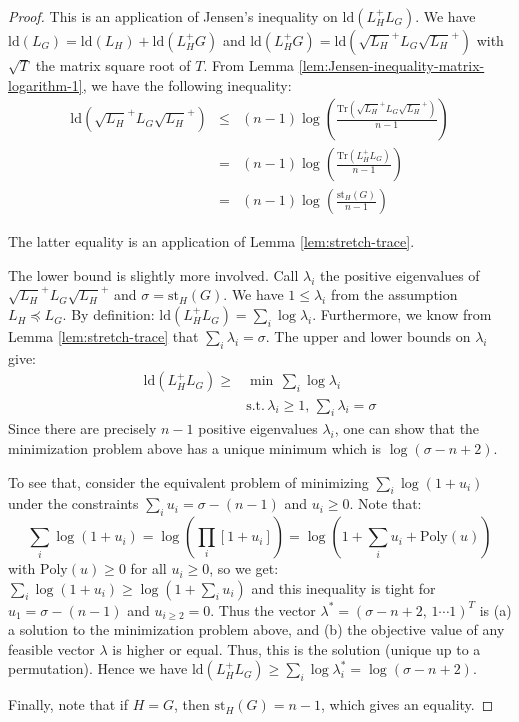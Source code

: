 \begin{proof}
This is an application of Jensen's inequality on $\text{ld}\left(L_{H}^{+}L_{G}\right)$.
We have $\text{ld}(L_{G})=\text{ld}(L_{H})+\text{ld}\left(L_{H}^{+}G\right)$
and $\text{ld}\left(L_{H}^{+}G\right)=\text{ld}\left(\sqrt{L_{H}}^{+}L_{G}\sqrt{L_{H}}^{+}\right)$
with $\sqrt{T}$ the matrix square root of $T$. From Lemma \ref{lem:Jensen-inequality-matrix-logarithm-1},
we have the following inequality: 
\begin{eqnarray*}
\text{ld}\left(\sqrt{L_{H}}^{+}L_{G}\sqrt{L_{H}}^{+}\right) & \leq & \left(n-1\right)\log\left(\frac{\text{Tr}\left(\sqrt{L_{H}}^{+}L_{G}\sqrt{L_{H}}^{+}\right)}{n-1}\right)\\
 & = & \left(n-1\right)\log\left(\frac{\text{Tr}\left(L_{H}^{+}L_{G}\right)}{n-1}\right)\\
 & = & \left(n-1\right)\log\left(\frac{\text{st}_{H}\left(G\right)}{n-1}\right)
\end{eqnarray*}


The latter equality is an application of Lemma \ref{lem:stretch-trace}.

The lower bound is slightly more involved. Call $\lambda_{i}$ the
positive eigenvalues of $\sqrt{L_{H}}^{+}L_{G}\sqrt{L_{H}}^{+}$ and
$\sigma=\text{st}_{H}\left(G\right)$. We have $1\leq\lambda_{i}$
from the assumption $L_{H}\preceq L_{G}$. By definition: $\text{ld}\left(L_{H}^{+}L_{G}\right)=\sum_{i}\log\lambda_{i}$.
Furthermore, we know from Lemma \ref{lem:stretch-trace} that $\sum_{i}\lambda_{i}=\sigma$.
The upper and lower bounds on $\lambda_{i}$ give: 
\begin{align*}
\text{ld}\left(L_{H}^{+}L_{G}\right)\geq & \min\,\sum_{i}\log\lambda_{i}\\
 & \text{s.t.}\,\lambda_{i}\geq1,\,\sum_{i}\lambda_{i}=\sigma
\end{align*}
Since there are precisely $n-1$ positive eigenvalues $\lambda_{i}$,
one can show that the minimization problem above has a unique minimum
which is $\log\left(\sigma-n+2\right)$.

To see that, consider the equivalent problem of minimizing $\sum_{i}\log\left(1+u_{i}\right)$
under the constraints $\sum_{i}u_{i}=\sigma-\left(n-1\right)$ and
$u_{i}\geq0$. Note that: 
\[
\sum_{i}\log\left(1+u_{i}\right)=\log\left(\prod_{i}\left[1+u_{i}\right]\right)=\log\left(1+\sum_{i}u_{i}+\text{Poly}\left(u\right)\right)
\]
with $\text{Poly}\left(u\right)\geq0$ for all $u_{i}\geq0$, so we
get: $\sum_{i}\log\left(1+u_{i}\right)\geq\log\left(1+\sum_{i}u_{i}\right)$
and this inequality is tight for $u_{1}=\sigma-\left(n-1\right)$
and $u_{i\geq2}=0$. Thus the vector $\lambda^{*}=\left(\sigma-n+2,\,1\cdots1\right)^{T}$
is (a) a solution to the minimization problem above, and (b) the objective
value of any feasible vector $\lambda$ is higher or equal. Thus,
this is the solution (unique up to a permutation). Hence we have $\text{ld}\left(L_{H}^{+}L_{G}\right)\geq\sum_{i}\log\lambda_{i}^{*}=\log\left(\sigma-n+2\right)$.

Finally, note that if $H=G$, then $\text{st}_{H}\left(G\right)=n-1$,
which gives an equality. 
\end{proof}
